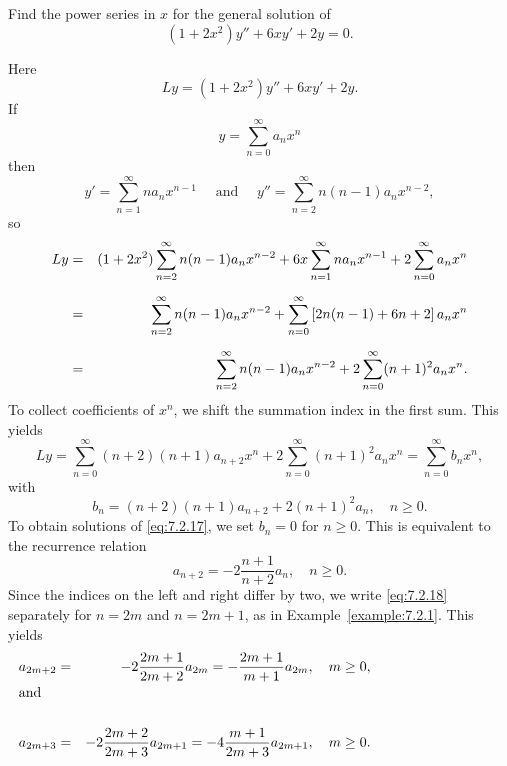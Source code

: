 \setcounter{example}{1}
\setcounter{equation}{16}
\begin{example}
  \label{example:7.2.2}\rm Find the power series in $x$ for the general solution of
  \begin{equation}
    \label{eq:7.2.17}(1+2x^{2})y''+6xy'+2y=0.
  \end{equation}
\end{example}
\setcounter{equation}{17}
\begin{examplesolution}
\solution Here
\[
  Ly=(1+2x^{2})y''+6xy'+2y.
\]
If
\[
  y=\sum_{n=0}^{\infty}a_{n}x^{n}
\]
then
\[
  y'=\sum_{n=1}^{\infty}na_{n}x^{n-1}\quad\mbox{ and }\quad y''=\sum_{n=2}^{\infty}n(n-1)a_{n}x^{n-2},
\]
so
\begin{eqnarray*}
  Ly & = & (1+2x^{2})\sum^{\infty}_{n=2}n(n-1)a_{n}x^{n-2}+6x\sum^{\infty}_{n=1}na_{n}x^{n-1}+2\sum^{\infty}_{n=0}a_{n}x^{n} \\[2\jot]
     & = & \sum_{n=2}^{\infty}n(n-1)a_{n}x^{n-2}+\sum_{n=0}^{\infty}\left[2n(n-1)+6n+2\right]a_{n}x^{n}                      \\[2\jot]
     & = & \sum_{n=2}^{\infty}n(n-1)a_{n}x^{n-2}+2\sum_{n=0}^{\infty}(n+1)^{2}a_{n}x^{n}.
\end{eqnarray*}
To collect coefficients of $x^{n}$, we shift the summation index in the first sum. This yields
\[
  Ly=\sum_{n=0}^{\infty}(n+2)(n+1)a_{n+2}x^{n}+2\sum_{n=0}^{\infty}(n+1)^{2}a_{n}x^{n}=\sum_{n=0}^{\infty}b_{n}x^{n},
\]
with
\[
  b_{n}=(n+2)(n+1)a_{n+2}+2(n+1)^{2}a_{n},\quad n\ge0.
\]
To obtain solutions of \eqref{eq:7.2.17}, we set $b_{n}=0$ for $n\ge0$. This is equivalent to the
recurrence relation
\begin{equation}
  \label{eq:7.2.18}a_{n+2}=-2{\frac{n+1}{n+2}}a_{n},\quad n\ge0.
\end{equation}
Since the indices on the left and right differ by two, we write \eqref{eq:7.2.18} separately for
$n=2m$ and $n=2m+1$, as in Example~\ref{example:7.2.1}. This yields
\begin{eqnarray}
  a_{2m+2}                                     & = & -2{\frac{2m+1}{2m+2}}a_{2m}=-\frac{2m+1}{m+1}a_{2m},\quad m\ge0,\label{eq:7.2.19} \\
  \noalign{\hspace*{-15pt}\mbox{and}}\nonumber                                                                                         \\
  a_{2m+3}                                     & = & -2{\frac{2m+2}{2m+3}}a_{2m+1}=-4{\frac{m+1}{2m+3}}a_{2m+1},\quad m\ge0.\label{eq:7.2.20}
\end{eqnarray}

\end{examplesolution}
